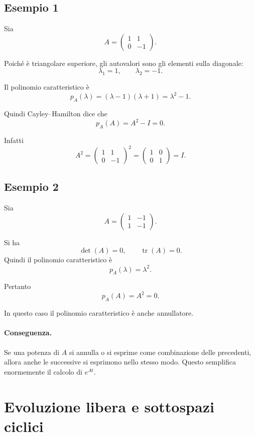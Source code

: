 \subsection{Esempio 1}

Sia
\[
A=
\begin{pmatrix}
1 & 1\\
0 & -1
\end{pmatrix}.
\]

Poiché è triangolare superiore, gli autovalori sono gli elementi sulla diagonale:
\[
\lambda_1=1,\qquad \lambda_2=-1.
\]

Il polinomio caratteristico è
\[
p_A(\lambda)=(\lambda-1)(\lambda+1)=\lambda^2-1.
\]

Quindi Cayley--Hamilton dice che
\[
p_A(A)=A^2-I=0.
\]

Infatti
\[
A^2=
\begin{pmatrix}
1 & 1\\
0 & -1
\end{pmatrix}^2
=
\begin{pmatrix}
1 & 0\\
0 & 1
\end{pmatrix}
=I.
\]

\subsection{Esempio 2}

Sia
\[
A=
\begin{pmatrix}
1 & -1\\
1 & -1
\end{pmatrix}.
\]

Si ha
\[
\det(A)=0,
\qquad
\operatorname{tr}(A)=0.
\]
Quindi il polinomio caratteristico è
\[
p_A(\lambda)=\lambda^2.
\]

Pertanto
\[
p_A(A)=A^2=0.
\]

In questo caso il polinomio caratteristico è anche annullatore.

\paragraph{Conseguenza.}
Se una potenza di $A$ si annulla o si esprime come combinazione delle precedenti, allora anche le successive si esprimono nello stesso modo. Questo semplifica enormemente il calcolo di $e^{At}$.

\section{Evoluzione libera e sottospazi ciclici}

